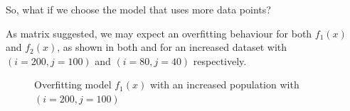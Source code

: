 \documentclass{tron}
\begin{document}
So, what if we choose the model that uses more data points? 

As matrix suggested, we may expect an overfitting behaviour for both $f_1(x)$ and $f_2(x)$, as shown in both  and  for an increased dataset with $(i=200, j=100)$ and $(i=80, j=40)$ respectively.
\begin{figure}[H]
	\centering
	\caption{Overfitting model $f_1(x)$ with an increased population with $(i=200, j=100)$\label{fig:p3:2:fit:1:over}}
\end{figure}
\end{document}
